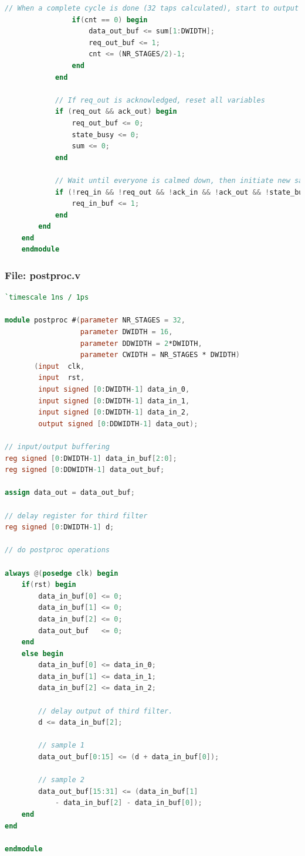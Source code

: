 \documentclass[a4paper,twoside,11pt, fleqn]{article}
\begin{document}
\begin{lstlisting}[language=Verilog]
                // When a complete cycle is done (32 taps calculated), start to output the outcome
                if(cnt == 0) begin
                    data_out_buf <= sum[1:DWIDTH];
                    req_out_buf <= 1;
                    cnt <= (NR_STAGES/2)-1;
                end
            end

            // If req_out is acknowledged, reset all variables
            if (req_out && ack_out) begin
                req_out_buf <= 0;
                state_busy <= 0;
                sum <= 0;
            end

            // Wait until everyone is calmed down, then initiate new sample request
            if (!req_in && !req_out && !ack_in && !ack_out && !state_busy) begin
                req_in_buf <= 1;
            end
        end
    end
    endmodule
\end{lstlisting}

\newpage
\subsubsection{File: postproc.v}
\begin{lstlisting}[language=Verilog]
`timescale 1ns / 1ps

module postproc #(parameter NR_STAGES = 32,
                  parameter DWIDTH = 16,
                  parameter DDWIDTH = 2*DWIDTH,
                  parameter CWIDTH = NR_STAGES * DWIDTH)
       (input  clk,
        input  rst,
        input signed [0:DWIDTH-1] data_in_0,
        input signed [0:DWIDTH-1] data_in_1,
        input signed [0:DWIDTH-1] data_in_2,
        output signed [0:DDWIDTH-1] data_out);

// input/output buffering
reg signed [0:DWIDTH-1] data_in_buf[2:0];
reg signed [0:DDWIDTH-1] data_out_buf;

assign data_out = data_out_buf;

// delay register for third filter
reg signed [0:DWIDTH-1] d;

// do postproc operations

always @(posedge clk) begin
    if(rst) begin
        data_in_buf[0] <= 0;
        data_in_buf[1] <= 0;
        data_in_buf[2] <= 0;
        data_out_buf   <= 0;
    end
    else begin
        data_in_buf[0] <= data_in_0;
        data_in_buf[1] <= data_in_1;
        data_in_buf[2] <= data_in_2;

        // delay output of third filter.
        d <= data_in_buf[2];

        // sample 1
        data_out_buf[0:15] <= (d + data_in_buf[0]);

        // sample 2
        data_out_buf[15:31] <= (data_in_buf[1] 
        	- data_in_buf[2] - data_in_buf[0]);
    end
end

endmodule
\end{lstlisting}
\end{document}
